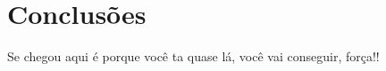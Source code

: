 \chapter{Conclusões}
\label{chap6}

Se chegou aqui é porque você ta quase lá, você vai conseguir, força!!
